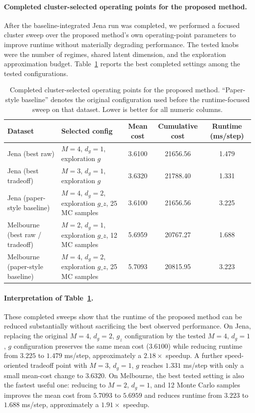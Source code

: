 \documentclass[11pt]{article}
\begin{document}
\paragraph{Completed cluster-selected operating points for the proposed method.}
After the baseline-integrated Jena run was completed, we performed a focused cluster sweep over the proposed method's own operating-point parameters to improve runtime without materially degrading performance. The tested knobs were the number of regimes, shared latent dimension, and the exploration approximation budget. Table~\ref{tab:operating_points_response} reports the best completed settings among the tested configurations.

\begin{table}[h]
\centering
\caption{Completed cluster-selected operating points for the proposed method. ``Paper-style baseline'' denotes the original configuration used before the runtime-focused sweep on that dataset. Lower is better for all numeric columns.}
\label{tab:operating_points_response}
\begin{tabular}{llccc}
\toprule
\textbf{Dataset} & \textbf{Selected config} & \textbf{Mean cost} & \textbf{Cumulative cost} & \textbf{Runtime (ms/step)} \\
\midrule
Jena (best raw) & $M=4$, $d_g=1$, exploration $g$ & 3.6100 & 21656.56 & 1.479 \\
Jena (best tradeoff) & $M=3$, $d_g=1$, exploration $g$ & 3.6320 & 21788.40 & 1.331 \\
Jena (paper-style baseline) & $M=4$, $d_g=2$, exploration $g\_z$, 25 MC samples & 3.6100 & 21656.56 & 3.225 \\
\midrule
Melbourne (best raw / tradeoff) & $M=2$, $d_g=1$, exploration $g\_z$, 12 MC samples & 5.6959 & 20767.27 & 1.688 \\
Melbourne (paper-style baseline) & $M=4$, $d_g=2$, exploration $g\_z$, 25 MC samples & 5.7093 & 20815.95 & 3.223 \\
\bottomrule
\end{tabular}
\end{table}

\paragraph{Interpretation of Table~\ref{tab:operating_points_response}.}
These completed sweeps show that the runtime of the proposed method can be reduced substantially without sacrificing the best observed performance. On Jena, replacing the original $M=4$, $d_g=2$, $g_z$ configuration by the tested $M=4$, $d_g=1$, $g$ configuration preserves the same mean cost ($3.6100$) while reducing runtime from $3.225$ to $1.479$ ms/step, approximately a $2.18\times$ speedup. A further speed-oriented tradeoff point with $M=3$, $d_g=1$, $g$ reaches $1.331$ ms/step with only a small mean-cost change to $3.6320$. On Melbourne, the best tested setting is also the fastest useful one: reducing to $M=2$, $d_g=1$, and 12 Monte Carlo samples improves the mean cost from $5.7093$ to $5.6959$ and reduces runtime from $3.223$ to $1.688$ ms/step, approximately a $1.91\times$ speedup.
\end{document}
